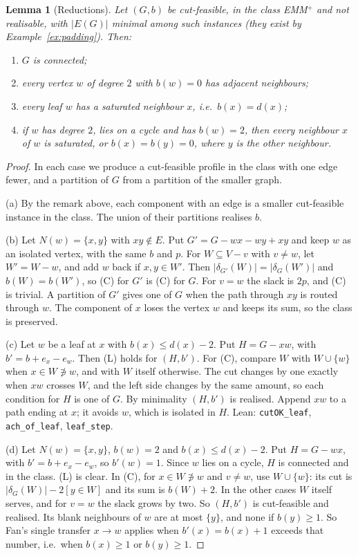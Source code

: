 \documentclass[11pt]{amsart}
\newtheorem{lemma}[theorem]{Lemma}
\theoremstyle{definition}
\begin{document}
\begin{lemma}[Reductions]\label{lem:reductions}
Let $(G,b)$ be cut-feasible, in the class EMM$^+$ and not realisable, with $|E(G)|$ minimal among
such instances (they exist by Example~\ref{ex:padding}). Then:
\begin{enumerate}[label=(\alph*)]
\item $G$ is connected;
\item every vertex $w$ of degree $2$ with $b(w)=0$ has adjacent neighbours;
\item every leaf $w$ has a saturated neighbour $x$, i.e.\ $b(x)=d(x)$;
\item if $w$ has degree $2$, lies on a cycle and has $b(w)=2$, then every neighbour $x$ of $w$ is
saturated, or $b(x)=b(y)=0$, where $y$ is the other neighbour.
\end{enumerate}
\end{lemma}
\begin{proof}
In each case we produce a cut-feasible profile in the class with one edge fewer, and a partition
of $G$ from a partition of the smaller graph.

(a) By the remark above, each component with an edge is a smaller cut-feasible instance in the
class. The union of their partitions realises $b$.

(b) Let $N(w)=\{x,y\}$ with $xy\notin E$. Put $G'=G-wx-wy+xy$ and keep $w$ as an isolated vertex,
with the same $b$ and $p$. For $W\subseteq V-v$ with $v\ne w$, let $W'=W-w$, and add $w$ back if
$x,y\in W'$. Then $|\delta_{G'}(W)|=|\delta_G(W')|$ and $b(W)=b(W')$, so (C) for $G'$ is (C) for $G$.
For $v=w$ the slack is $2p$, and (C) is trivial. A partition of $G'$ gives one of $G$ when the path
through $xy$ is routed through $w$. The component of $x$ loses the vertex $w$ and keeps its
sum, so the class is preserved.

(c) Let $w$ be a leaf at $x$ with $b(x)\le d(x)-2$. Put $H=G-xw$, with $b'=b+e_x-e_w$. Then
(L) holds for $(H,b')$. For (C), compare $W$ with $W\cup\{w\}$ when $x\in W\not\ni w$, and with $W$
itself otherwise. The cut changes by one exactly when $xw$ crosses $W$, and the left side changes
by the same amount, so each condition for $H$ is one of $G$. By minimality $(H,b')$ is realised.
Append $xw$ to a path ending at $x$; it avoids $w$, which is isolated in $H$. Lean:
\texttt{cutOK\_leaf}, \texttt{ach\_of\_leaf}, \texttt{leaf\_step}.

(d) Let $N(w)=\{x,y\}$, $b(w)=2$ and $b(x)\le d(x)-2$. Put $H=G-wx$, with $b'=b+e_x-e_w$, so
$b'(w)=1$. Since $w$ lies on a cycle, $H$ is connected and in the class. (L) is clear. In (C), for $x\in W\not\ni w$ and $v\ne w$, use $W\cup\{w\}$: its cut is
$|\delta_G(W)|-2[y\in W]$ and its sum is $b(W)+2$. In the other cases $W$ itself serves, and for
$v=w$ the slack grows by two. So $(H,b')$ is cut-feasible and realised. Its blank neighbours of
$w$ are at most $\{y\}$, and none if $b(y)\ge1$. So Fan's single transfer $x\to w$ applies when
$b'(x)=b(x)+1$ exceeds that number, i.e.\ when $b(x)\ge1$ or $b(y)\ge1$.
\end{proof}
\end{document}

